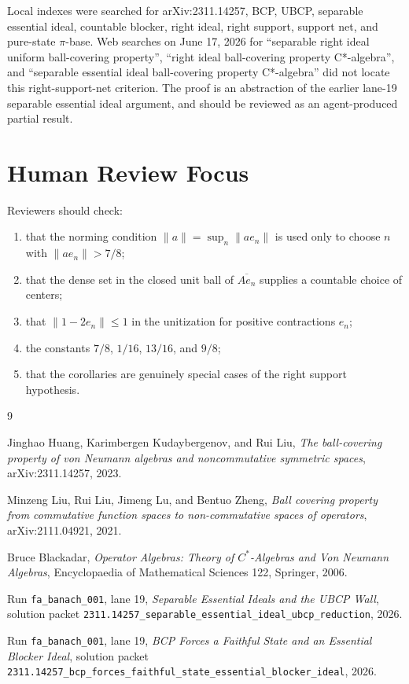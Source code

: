 \documentclass[11pt]{article}
\newcommand{\cl}{\overline}
\begin{document}
Local indexes were searched for arXiv:2311.14257, BCP, UBCP, separable
essential ideal, countable blocker, right ideal, right support, support net,
and pure-state \(\pi\)-base.  Web searches on June 17, 2026 for
``separable right ideal uniform ball-covering property'', ``right ideal
ball-covering property C*-algebra'', and ``separable essential ideal
ball-covering property C*-algebra'' did not locate this right-support-net
criterion.  The proof is an abstraction of the earlier lane-19 separable
essential ideal argument, and should be reviewed as an agent-produced partial
result.

\section*{Human Review Focus}

Reviewers should check:
\begin{enumerate}
    \item that the norming condition \(\|a\|=\sup_n\|ae_n\|\) is used only to
          choose \(n\) with \(\|ae_n\|>7/8\);
    \item that the dense set in the closed unit ball of \(\cl{Ae_n}\) supplies
          a countable choice of centers;
    \item that \(\|1-2e_n\|\le1\) in the unitization for positive
          contractions \(e_n\);
    \item the constants \(7/8\), \(1/16\), \(13/16\), and \(9/8\);
    \item that the corollaries are genuinely special cases of the right
          support hypothesis.
\end{enumerate}

\begin{thebibliography}{9}

Jinghao Huang, Karimbergen Kudaybergenov, and Rui Liu,
\emph{The ball-covering property of von Neumann algebras and noncommutative
symmetric spaces},
arXiv:2311.14257, 2023.

Minzeng Liu, Rui Liu, Jimeng Lu, and Bentuo Zheng,
\emph{Ball covering property from commutative function spaces to
non-commutative spaces of operators},
arXiv:2111.04921, 2021.

Bruce Blackadar,
\emph{Operator Algebras: Theory of \(C^*\)-Algebras and Von Neumann
Algebras},
Encyclopaedia of Mathematical Sciences 122, Springer, 2006.

Run \texttt{fa\_banach\_001}, lane 19,
\emph{Separable Essential Ideals and the UBCP Wall},
solution packet
\texttt{2311.14257\_separable\_essential\_ideal\_ubcp\_reduction}, 2026.

Run \texttt{fa\_banach\_001}, lane 19,
\emph{BCP Forces a Faithful State and an Essential Blocker Ideal},
solution packet
\texttt{2311.14257\_bcp\_forces\_faithful\_state\_essential\_blocker\_ideal},
2026.

\end{thebibliography}
\end{document}
